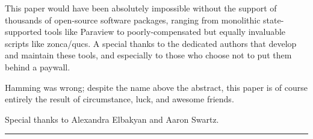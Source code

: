 \documentclass[paper.tex]{subfiles}
\begin{document}
This paper would have been absolutely impossible without the support of thousands of open-source software packages, ranging from monolithic state-supported tools like Paraview to poorly-compensated but equally invaluable scripts like zonca/qucs\cite{Modeling2010}. A special thanks to the dedicated authors that develop and maintain these tools, and especially to those who choose not to put them behind a paywall.

Hamming was wrong; despite the name above the abstract, this paper is of course entirely the result of circumstance, luck, and awesome friends. 

Special thanks to Alexandra Elbakyan and Aaron Swartz.

\rule{\linewidth}{0.2pt}



%
\end{document}
